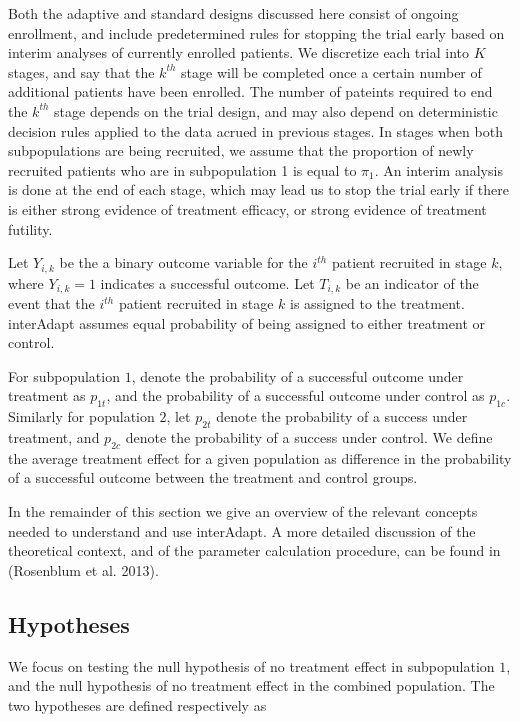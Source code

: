 \documentclass{article}
\newcommand{\interAdapt}{\textsf{interAdapt }}
\begin{document}
Both the adaptive and standard designs discussed here consist of ongoing enrollment, and include predetermined rules for stopping the trial early based on interim analyses of currently enrolled patients. We discretize each trial into $K$ stages, and say that the $k ^{th}$ stage will be completed once a certain number of additional patients have been enrolled. The number of pateints required to end the $k^{th}$ stage depends on the trial design, and may also depend on deterministic decision rules applied to the data acrued in previous stages. In stages when both subpopulations are being recruited, we assume that the proportion of newly recruited patients who are in subpopulation 1 is equal to $π_1$. An interim analysis is done at the end of each stage, which may lead us to stop the trial early if there is either strong evidence of treatment efficacy, or strong evidence of treatment futility.

Let $Y_{i,k}$ be the a binary outcome variable for the $i^{th}$ patient recruited in stage $k$, where $Y_{i,k}=1$ indicates a successful outcome. Let $T_{i,k}$ be an indicator of the event that the $i^{th}$ patient recruited in stage $k$ is assigned to the treatment. \interAdapt assumes equal probability of being assigned to either treatment or control.

For subpopulation $1$, denote the probability of a successful outcome under treatment as $p_{1t}$, and the probability of a successful outcome under control as $p_{1c}$. Similarly for population $2$, let $p_{2t}$ denote the probability of a success under treatment, and $p_{2c}$ denote the probability of a success under control. We define the average treatment effect for a given population as difference in the probability of a successful outcome between the treatment and control groups.


In the remainder of this section we give an overview of the relevant concepts needed to understand and use \textsf{interAdapt}. A more detailed discussion of the theoretical context, and of the parameter calculation procedure, can be found in (Rosenblum et al. 2013)\cite{Rosenblum2013AdaptMISTIE}.
 
\subsection*{Hypotheses}

We focus on testing the null hypothesis of no treatment effect in subpopulation $1$, and the null hypothesis of no treatment effect in the combined population. The two hypotheses are defined respectively as
\end{document}
